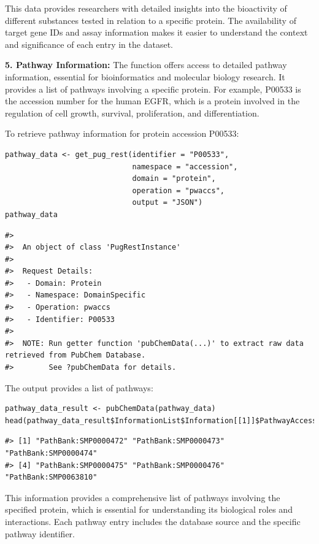This data provides researchers with detailed insights into the bioactivity of different substances tested in relation to a specific protein. The availability of target gene IDs and assay information makes it easier to understand the context and significance of each entry in the dataset.

\textbf{5. Pathway Information:} The function offers access to detailed pathway information, essential for bioinformatics and molecular biology research. It provides a list of pathways involving a specific protein. For example, P00533 is the accession number for the human EGFR, which is a protein involved in the regulation of cell growth, survival, proliferation, and differentiation.

To retrieve pathway information for protein accession P00533:

\begin{verbatim}
pathway_data <- get_pug_rest(identifier = "P00533", 
                             namespace = "accession", 
                             domain = "protein", 
                             operation = "pwaccs", 
                             output = "JSON")
pathway_data
\end{verbatim}

\begin{verbatim}
#> 
#>  An object of class 'PugRestInstance'
#> 
#>  Request Details:  
#>   - Domain: Protein
#>   - Namespace: DomainSpecific
#>   - Operation: pwaccs
#>   - Identifier: P00533
#> 
#>  NOTE: Run getter function 'pubChemData(...)' to extract raw data retrieved from PubChem Database. 
#>        See ?pubChemData for details.
\end{verbatim}

The output provides a list of pathways:

\begin{verbatim}
pathway_data_result <- pubChemData(pathway_data)
head(pathway_data_result$InformationList$Information[[1]]$PathwayAccession)
\end{verbatim}

\begin{verbatim}
#> [1] "PathBank:SMP0000472" "PathBank:SMP0000473" "PathBank:SMP0000474"
#> [4] "PathBank:SMP0000475" "PathBank:SMP0000476" "PathBank:SMP0063810"
\end{verbatim}

This information provides a comprehensive list of pathways involving the specified protein, which is essential for understanding its biological roles and interactions. Each pathway entry includes the database source and the specific pathway identifier.


